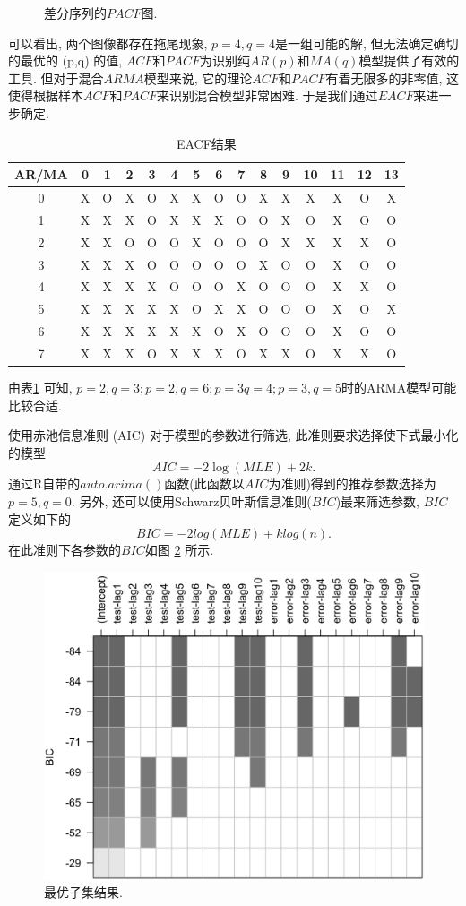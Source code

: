 \documentclass[12pt]{article}
\begin{document}
\begin{center}
\begin{minipage}{0.45\textwidth}
\begin{figure}
            \caption{差分序列的$PACF$图.\label{fig:4}}
        \end{figure}
    \end{minipage}
\end{center}
\qquad 可以看出, 两个图像都存在拖尾现象, $p=4,q=4$是一组可能的解, 但无法确定确切的最优的 (p,q) 的值, $ACF$和$PACF$为识别纯$AR(p)$和$MA(q)$模型提供了有效的工具. 但对于混合$ARMA$模型来说, 它的理论$ACF$和$PACF$有着无限多的非零值, 这使得根据样本$ACF$和$PACF$来识别混合模型非常困难. 于是我们通过$EACF$来进一步确定.
\begin{longtable}[c]{c|cccccccccccccc}
    \caption{EACF结果}
    \label{tab:my-table}\\
    \hline
    AR/MA & 0 & 1 & 2 & 3 & 4 & 5 & 6 & 7 & 8 & 9 & 10 & 11 & 12 & 13 \\ \hline
    \endfirsthead
    \endhead
    \hline
    \endfoot
    \endlastfoot
    0     & X & O & X & O & X & X & O & O & X & X & X  & X  & O  & X  \\
    1     & X & X & X & O & X & X & X & O & O & X & O  & X  & O  & O  \\
    2     & X & X & O & O & O & X & O & O & O & X & X  & X  & X  & O  \\
    3     & X & X & X & O & O & O & O & O & X & O & O  & X  & O  & O  \\
    4     & X & X & X & X & O & O & O & X & O & O & O  & X  & X  & O  \\
    5     & X & X & X & X & X & O & X & X & O & O & O  & X  & O  & X  \\
    6     & X & X & X & X & X & X & O & X & O & O & O  & X  & O  & O  \\
    7     & X & X & X & O & X & X & X & O & X & X & O  & X  & X  & O  \\ \hline
    \end{longtable}
由表\ref{tab:my-table} 可知, $p=2,q=3;p=2,q=6;p=3 q=4;p=3,q=5$时的ARMA模型可能比较合适. 

\qquad 使用赤池信息准则 (AIC) 对于模型的参数进行筛选, 此准则要求选择使下式最小化的模型\[
    AIC=-2\log(MLE) +2k.
\]
通过R自带的$auto.arima()$函数(此函数以$AIC$为准则)得到的推荐参数选择为$p=5,q=0$. 另外, 还可以使用Schwarz贝叶斯信息准则($BIC$)最来筛选参数, $BIC$定义如下的\[
    BIC= -2log(MLE)+klog(n).
\]
在此准则下各参数的$BIC$如图 \ref{fig:bic} 所示.
\begin{figure}
    \centering
    \includegraphics[width=.5\textwidth]{bic}
    \caption{最优子集结果. \label{fig:bic}}
\end{figure}
\end{document}
